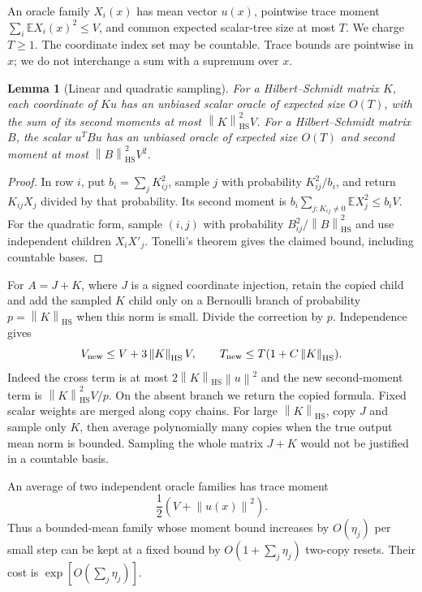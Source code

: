 \documentclass[11pt]{article}
\newtheorem{lemma}[theorem]{Lemma}
\theoremstyle{remark}\newtheorem{remark}[theorem]{Remark}
\newcommand{\E}{\mathbb E}
\newcommand{\HS}{\mathrm{HS}}
\newcommand{\norm}[1]{\left\lVert #1\right\rVert}
\begin{document}
An oracle family $X_i(x)$ has mean vector $u(x)$, pointwise trace moment
$\sum_i\E X_i(x)^2\le V$, and common expected scalar-tree size at most $T$.
We charge $T\ge1$. The coordinate index set may be countable. Trace bounds
are pointwise in $x$; we do not interchange a sum with a supremum over $x$.

\begin{lemma}[Linear and quadratic sampling]\label{lem:sampling}
For a Hilbert--Schmidt matrix $K$, each coordinate of $Ku$ has an unbiased
scalar oracle of expected size $O(T)$, with the sum of its second moments
at most $\norm K_\HS^2 V$. For a Hilbert--Schmidt matrix $B$, the scalar
$u^TBu$ has an unbiased oracle of expected size $O(T)$ and second moment
at most $\norm B_\HS^2V^2$.
\end{lemma}
\begin{proof}
In row $i$, put $b_i=\sum_jK_{ij}^2$, sample $j$ with probability
$K_{ij}^2/b_i$, and return $K_{ij}X_j$ divided by that probability.
Its second moment is $b_i\sum_{j:K_{ij}\ne0}\E X_j^2\le b_iV$.
For the quadratic form, sample $(i,j)$ with probability
$B_{ij}^2/\norm B_\HS^2$ and use independent children $X_iX'_j$.
Tonelli's theorem gives the claimed bound, including countable bases.
\end{proof}

For $A=J+K$, where $J$ is a signed coordinate injection, retain the copied
child and add the sampled $K$ child only on a Bernoulli branch of probability
$p=\norm K_\HS$ when this norm is small. Divide the correction by $p$.
Independence gives
\begin{equation}\label{eq:nearcopy}
 V_{\rm new}\le V+3\norm K_\HS V,
 \qquad T_{\rm new}\le T(1+C\norm K_\HS).
\end{equation}
Indeed the cross term is at most $2\norm K_\HS\norm u^2$ and the new
second-moment term is $\norm K_\HS^2V/p$. On the absent branch we return
the copied formula. Fixed scalar weights are merged along copy chains.
For large $\norm K_\HS$, copy $J$ and sample only $K$, then average
polynomially many copies when the true output mean norm is bounded.
Sampling the whole matrix $J+K$ would not be justified in a countable basis.

An average of two independent oracle families has trace moment
\begin{equation}\label{eq:reset}
 \frac12\left(V+\norm{u(x)}^2\right).
\end{equation}
Thus a bounded-mean family whose moment bound increases by $O(\eta_j)$
per small step can be kept at a fixed bound by $O(1+\sum_j\eta_j)$
two-copy resets. Their cost is $\exp[O(\sum_j\eta_j)]$.
\end{document}
